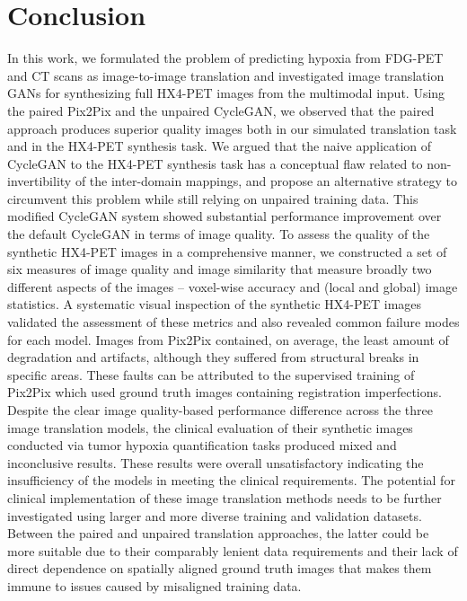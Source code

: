\chapter{Conclusion}
\label{Conclusion}

In this work, we formulated the problem of predicting hypoxia from FDG-PET and CT scans as image-to-image translation and investigated image translation GANs for synthesizing full HX4-PET images from the multimodal input. Using the paired Pix2Pix and the unpaired CycleGAN, we observed that the paired approach produces superior quality images both in our simulated translation task and in the HX4-PET synthesis task. We argued that the naive application of CycleGAN to the HX4-PET synthesis task has a conceptual flaw related to non-invertibility of the inter-domain mappings, and propose an alternative strategy to circumvent this problem while still relying on unpaired training data. This modified CycleGAN system showed substantial performance improvement over the default CycleGAN in terms of image quality. To assess the quality of the synthetic HX4-PET images in a comprehensive manner, we constructed a set of six measures of image quality and image similarity that measure broadly two different aspects of the images -- voxel-wise accuracy and (local and global) image statistics. A systematic visual inspection of the synthetic HX4-PET images validated the assessment of these metrics and also revealed common failure modes for each model. Images from Pix2Pix contained, on average, the least amount of degradation and artifacts, although they suffered from structural breaks in specific areas. These faults can be attributed to the supervised training of Pix2Pix which used ground truth images containing registration imperfections. Despite the clear image quality-based performance difference across the three image translation models, the clinical evaluation of their synthetic images conducted via tumor hypoxia quantification tasks produced mixed and inconclusive results. These results were overall unsatisfactory indicating the insufficiency of the models in meeting the clinical requirements. The potential for clinical implementation of these image translation methods needs to be further investigated using larger and more diverse training and validation datasets. Between the paired and unpaired translation approaches, the latter could be more suitable due to their comparably lenient data requirements and their lack of direct dependence on spatially aligned ground truth images that makes them immune to issues caused by misaligned training data.